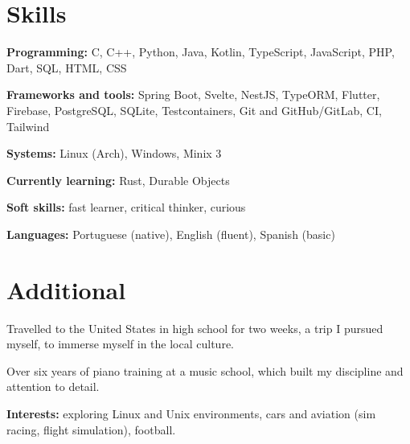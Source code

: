\documentclass[11pt]{article}
\newcommand{\skill}[2]{\textbf{#1:} #2\par}
\begin{document}
\section{Skills}
\skill{Programming}{C, C++, Python, Java, Kotlin, TypeScript, JavaScript, PHP, Dart, SQL, HTML, CSS}
\skill{Frameworks and tools}{Spring Boot, Svelte, NestJS, TypeORM, Flutter, Firebase, PostgreSQL, SQLite,
  Testcontainers, Git and GitHub/GitLab, CI, Tailwind}
\skill{Systems}{Linux (Arch), Windows, Minix 3}
\skill{Currently learning}{Rust, Durable Objects}
\skill{Soft skills}{fast learner, critical thinker, curious}
\skill{Languages}{Portuguese (native), English (fluent), Spanish (basic)}

\section{Additional}
Travelled to the United States in high school for two weeks, a trip I pursued myself, to immerse myself in the
local culture.

Over six years of piano training at a music school, which built my discipline and attention to detail.

\skill{Interests}{exploring Linux and Unix environments, cars and aviation (sim racing, flight simulation), football.}
\end{document}

